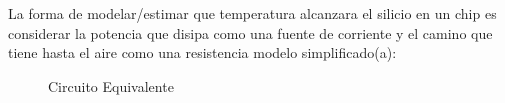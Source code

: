 
La forma de modelar/estimar que temperatura alcanzara el silicio en un chip es considerar
la potencia que disipa como una fuente de corriente y el camino que tiene hasta el aire como
una resistencia modelo simplificado(a):

\begin{figure}[H]
    \centering
    
    \caption{Circuito Equivalente}
    \label{fig:ThermalEquivalent}
\end{figure}
